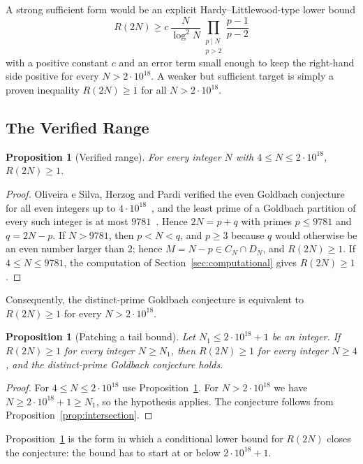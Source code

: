 \documentclass[11pt]{amsart}
\newtheorem{Proposition}[Theorem]{Proposition}
\theoremstyle{definition}
\theoremstyle{remark}
\begin{document}
A strong sufficient form would be an explicit Hardy--Littlewood-type lower bound
\[
R(2N)\geq c\,\frac{N}{\log^2 N}
\prod_{\substack{p\mid N\\ p>2}}\frac{p-1}{p-2}
\]
with a positive constant $c$ and an error term small enough to keep the right-hand side positive for every $N>2\cdot 10^{18}$. A weaker but sufficient target is simply a proven inequality $R(2N)\geq 1$ for all $N>2\cdot 10^{18}$.

\subsection{The Verified Range}\label{subsec:verified}
\begin{Proposition}[Verified range]\label{prop:verified}
For every integer $N$ with $4\leq N\leq 2\cdot 10^{18}$, $R(2N)\geq 1$.
\end{Proposition}
\begin{proof}
Oliveira e Silva, Herzog and Pardi verified the even Goldbach conjecture for all even integers up to $4\cdot 10^{18}$~\cite{oliveira2014empirical}, and the least prime of a Goldbach partition of every such integer is at most $9781$~\cite{oliveira2014goldbachweb}. Hence $2N=p+q$ with primes $p\leq 9781$ and $q=2N-p$. If $N>9781$, then $p<N<q$, and $p\geq 3$ because $q$ would otherwise be an even number larger than $2$; hence $M=N-p\in C_N\cap D_N$, and $R(2N)\geq 1$. If $4\leq N\leq 9781$, the computation of Section~\ref{sec:computational} gives $R(2N)\geq 1$.
\end{proof}
Consequently, the distinct-prime Goldbach conjecture is equivalent to $R(2N)\geq 1$ for every $N>2\cdot 10^{18}$.
\begin{Proposition}[Patching a tail bound]\label{prop:tail}
Let $N_1\leq 2\cdot 10^{18}+1$ be an integer. If $R(2N)\geq 1$ for every integer $N\geq N_1$, then $R(2N)\geq 1$ for every integer $N\geq 4$, and the distinct-prime Goldbach conjecture holds.
\end{Proposition}
\begin{proof}
For $4\leq N\leq 2\cdot 10^{18}$ use Proposition~\ref{prop:verified}. For $N>2\cdot 10^{18}$ we have $N\geq 2\cdot 10^{18}+1\geq N_1$, so the hypothesis applies. The conjecture follows from Proposition~\ref{prop:intersection}.
\end{proof}
Proposition~\ref{prop:tail} is the form in which a conditional lower bound for $R(2N)$ closes the conjecture: the bound has to start at or below $2\cdot 10^{18}+1$.
\end{document}
